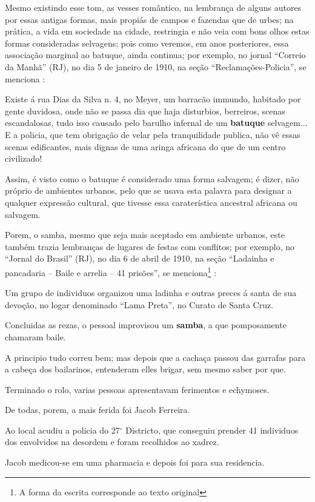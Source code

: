 Mesmo existindo esse tom, as vesses romântico, 
na lembrança de alguns autores por essas antigas formas,
mais propiás de campos e fazendas que de urbes;
na prática, a vida em sociedade na cidade, 
restringia e não veia com bons olhos estas formas consideradas selvagens;
pois como veremos, em anos posteriores, essa associação marginal ao batuque, ainda continua;
por exemplo, no jornal ``Correio da Manhã'' (RJ), 
no dia 5 de janeiro de 1910, na seção ``Reclamações-Policia'',
se menciona \cite[pp. 4]{batuqueperiodicocorreiomanha}:
\begin{citando}%
Existe á rua Dias da Silva n. 4, no 
Meyer, um barracão immundo, habitado por
gente duvidosa, onde não se passa dia que 
haja disturbios, berreiros, scenas 
escandalosas, tudo isso causado pelo barulho
infernal de um \textbf{batuque} selvagem... E a 
policia, que tem obrigação de velar pela 
tranquilidade publica, não vê essas scenas
edificantes, mais dignas de uma aringa 
africana do que de um centro civilizado!
\end{citando}
Assim, é visto como o batuque é considerado uma forma salvagem;
é dizer, não próprio de ambientes urbanos,
pelo que se usava esta palavra para designar a qualquer expressão cultural,
 que tivesse essa caraterística ancestral africana ou salvagem. 

Porem, o samba, mesmo que seja mais aceptado em ambiente urbanos,
este também trazia lembranças de lugares de festas com conflitos;
por exemplo, no ``Jornal do Brasil'' (RJ), 
no dia 6 de abril de 1910, na seção ``Ladainha e pancadaria -- Baile e arrelia -- 41 prisões'',
se menciona\footnote{\label{footort5}A forma da escrita corresponde ao texto original} \cite[pp. 12]{batuqueperiodicojornaldobrasil}:
\begin{citando}%
Um grupo de individuos organizou
uma ladinha e outras preces 
á santa de sua devoção, no logar 
denominado ``Lama Preta'', no 
Curato de Santa Cruz.

Concluidas as rezas, o pessoal 
improvisou um \textbf{samba}, a que 
pomposamente chamaram baile.

A principio tudo correu bem;
mas depois que a cachaça passou
das garrafas para a cabeça dos 
bailarinos, entenderam elles 
brigar, sem mesmo saber por que.

Terminado o rolo, varias 
pessoas apresentavam ferimentos e echymoses.

De todas, porem, a mais ferida foi Jacob Ferreira.

Ao local acudiu a policia do 27$^{\circ}$ 
Districto, que conseguiu prender 
41 individuos dos envolvidos na 
desordem e foram recolhidos ao xadrez.

Jacob medicou-se em uma pharmacia e depois foi para sua residencia.
\end{citando}


